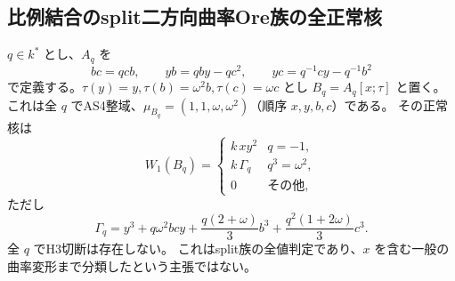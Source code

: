 \subsection{比例結合のsplit二方向曲率Ore族の全正常核}
\label{subsec:cubic-third-root-unit-split-double-Ore}
\begin{theorem}[split二方向曲率族の全値分類とH3排除]
\label{thm:cubic-third-root-unit-split-double-Ore-empty}
$q\in k^*$ とし、$A_q$ を
\[
 bc=qcb,\qquad yb=qby-qc^2,\qquad yc=q^{-1}cy-q^{-1}b^2
\]
で定義する。$\tau(y)=y,\tau(b)=\omega^2b,\tau(c)=\omega c$ とし
$B_q=A_q[x;\tau]$ と置く。
これは全 $q$ でAS4整域、$\mu_{B_q}=(1,1,\omega,\omega^2)$（順序 $x,y,b,c$）である。
その正常核は
\[
 W_1(B_q)=\begin{cases}
 k\,xy^2&q=-1,\\
 k\,\Gamma_q&q^3=\omega^2,\\
 0&\text{その他},
 \end{cases}
\]
ただし
\[
 \Gamma_q=y^3+q\omega^2bcy+
 \frac{q(2+\omega)}3b^3+\frac{q^2(1+2\omega)}3c^3.
\]
全 $q$ でH3切断は存在しない。
これはsplit族の全値判定であり、$x$ を含む一般の曲率変形まで分類したという主張ではない。
\end{theorem}
